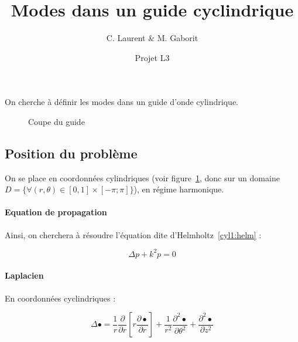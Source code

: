 \documentclass[11pt]{article}
\title{Modes dans un guide cyclindrique}
\author{C. Laurent \& M. Gaborit}
\date{Projet L3}
\begin{document}
\maketitle

On cherche à définir les modes dans un guide d'onde cylindrique.

\begin{figure}
\caption{\label{cyl1:fig} Coupe du guide}
\end{figure}

\subsection*{Position du problème}

On se place en coordonnées cylindriques (voir figure~\ref{cyl1:fig}, donc sur un domaine $D =
\{\forall(r,\theta)\in[0,1]\times[-\pi;\pi]\}$), en régime harmonique.

\paragraph{Equation de propagation} Ainsi, on cherchera à résoudre l'équation dite d'Helmholtz~\eqref{cyl1:helm} :

\begin{equation}
\Delta p  + k^2p = 0 \label{cyl1:helm}
\end{equation}

\paragraph{Laplacien} En coordonnées cyclindriques :

$$\Delta \bullet = \frac{1}{r}\frac{\partial}{\partial r}\left[r\frac{\partial\bullet}{\partial r}\right] +
\frac{1}{r^2}\frac{\partial^2\bullet}{\partial\theta^2}+\frac{\partial^2\bullet}{\partial z^2}$$
\end{document}
